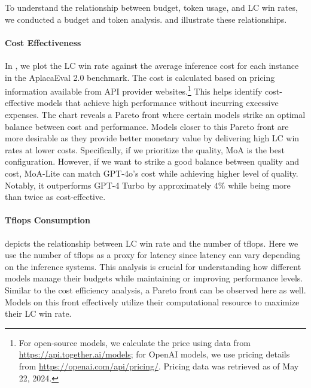\documentclass{article}
\begin{document}

To understand the relationship between budget, token usage, and LC win rates, 
we conducted a budget and token analysis. 
 and  illustrate these relationships.

\paragraph{Cost Effectiveness}
In , we plot the LC win rate against 
the average inference cost for each instance in the AplacaEval 2.0 benchmark.
The cost is calculated based on pricing information available from API provider websites.\footnote{
For open-source models, we calculate the price using data from \url{https://api.together.ai/models};
for OpenAI models, we use pricing details from \url{https://openai.com/api/pricing/}. 
Pricing data was retrieved as of May 22, 2024.
}
This helps identify cost-effective models that achieve high performance without incurring excessive expenses.
The chart reveals a Pareto front where certain models strike an optimal balance between cost and performance.
Models closer to this Pareto front are more desirable as they provide better monetary value by delivering high LC win rates at lower costs.
Specifically, if we prioritize the quality, MoA is the best configuration.
However, if we want to strike a good balance between quality and cost, MoA-Lite can match GPT-4o's cost while achieving higher level of quality.
Notably, it outperforms GPT-4 Turbo by approximately $4\%$ while being more than twice as cost-effective.

\paragraph{Tflops Consumption}
 depicts the relationship between LC win rate and the number of tflops. 
Here we use the number of tflops as a proxy for latency since latency can vary depending on the inference systems.
This analysis is crucial for understanding how different models manage their budgets
while maintaining or improving performance levels. 
Similar to the cost efficiency analysis, a Pareto front can be observed here as well.
Models on this front effectively utilize their computational resource to maximize their LC win rate. 
\end{document}
